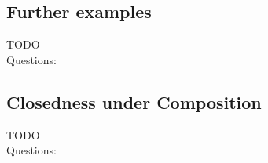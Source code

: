 \documentclass[a4]{scrartcl}
\begin{document}
\subsection*{Further examples}

\color{red} TODO \\
\color{black}
\color{violet} Questions:
\color{black}








\subsection*{Closedness under Composition}


\color{red} TODO \\
\color{black}
\color{violet} Questions:
\color{black}





\newpage

\printbibliography
\end{document}

